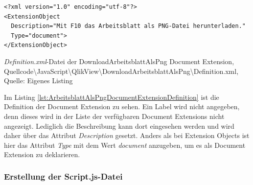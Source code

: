 \begin{listing}[htbp]
\begin{verbatim}
<?xml version="1.0" encoding="utf-8"?>
<ExtensionObject
  Description="Mit F10 das Arbeitsblatt als PNG-Datei herunterladen."
  Type="document">
</ExtensionObject>
\end{verbatim}
\caption[\textit{Definition.xml}-Datei der DownloadArbeitsblattAlsPng Document Extension]{\textit{Definition.xml}-Datei der DownloadArbeitsblattAlsPng Document Extension, \\Quellcode\textbackslash{}JavaScript\textbackslash{}QlikView\textbackslash{}DownloadArbeitsblattAlsPng\textbackslash{}Definition.xml, \\Quelle: Eigenes Listing}
\label{lst:ArbeitsblattAlsPngDocumentExtensionDefinition}
\end{listing}

Im Listing \ref{lst:ArbeitsblattAlsPngDocumentExtensionDefinition} ist die Definition der Document Extension zu sehen. Ein Label wird nicht angegeben, denn dieses wird in der Liste der verfügbaren Document Extensions nicht angezeigt. Lediglich die Beschreibung kann dort eingesehen werden und wird daher über das Attribut \textit{Description} gesetzt. Anders als bei Extension Objects ist hier das Attribut \textit{Type} mit dem Wert \textit{document} anzugeben, um es als Document Extension zu deklarieren.

\subsubsection{Erstellung der Script.js-Datei}

